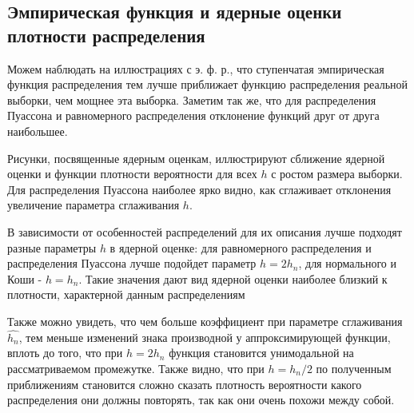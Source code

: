 \subsection{Эмпирическая функция и ядерные оценки плотности распределения}
Можем наблюдать на иллюстрациях с э. ф. р., что ступенчатая эмпирическая функция распределения тем лучше приближает функцию распределения реальной выборки, чем мощнее эта выборка. Заметим так же, что для
распределения Пуассона и равномерного распределения отклонение функций друг от друга наибольшее.

Рисунки, посвященные ядерным оценкам, иллюстрируют сближение ядерной оценки и функции плотности вероятности для всех $h$ с ростом размера
выборки. Для распределения Пуассона наиболее ярко видно, как сглаживает отклонения увеличение параметра сглаживания $h$.

В зависимости от особенностей распределений для их описания лучше подходят разные параметры $h$ в ядерной оценке: для равномерного распределения и распределения Пуассона лучше подойдет параметр $h = 2h_n$, для нормального и Коши - $h = h_n$.
Такие значения дают вид ядерной оценки наиболее близкий к плотности,
характерной данным распределениям

Также можно увидеть, что чем больше коэффициент при параметре сглаживания $\hat{h_n}$, тем меньше изменений знака производной у аппроксимирующей функции, вплоть до того, что при $h = 2h_n$ функция становится унимодальной на рассматриваемом промежутке. Также видно, что при $h = h_n / 2$
по полученным приближениям становится сложно сказать плотность вероятности какого распределения они должны повторять, так как они очень
похожи между собой.